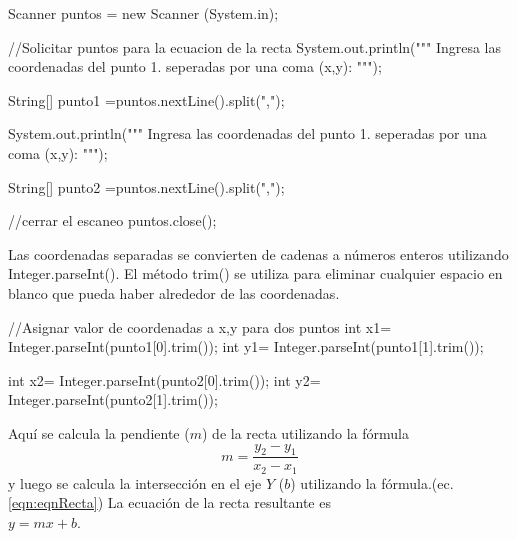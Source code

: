 \begin{javaCode}

Scanner puntos = new Scanner (System.in);
        
    //Solicitar puntos para la ecuacion de la recta  
    System.out.println("""
                        Ingresa las coordenadas del punto 1.
                        seperadas por una coma (x,y):
                           """);
    
    String[] punto1 =puntos.nextLine().split(",");
        
    System.out.println("""
                        Ingresa las coordenadas del punto 1.
                        seperadas por una coma (x,y):
                        """);
    
    String[] punto2 =puntos.nextLine().split(",");
        
    //cerrar el escaneo
    puntos.close();
        
\end{javaCode}

Las coordenadas separadas se convierten de cadenas a números enteros utilizando Integer.parseInt(). El método trim() se utiliza para eliminar cualquier espacio en blanco que pueda haber alrededor de las coordenadas.

\begin{javaCode}
    //Asignar valor de coordenadas a x,y para dos puntos
    int x1= Integer.parseInt(punto1[0].trim());
    int y1= Integer.parseInt(punto1[1].trim());
       
    int x2= Integer.parseInt(punto2[0].trim());
    int y2= Integer.parseInt(punto2[1].trim());
\end{javaCode}

Aquí se calcula la pendiente ($m$) de la recta utilizando la fórmula
\[
m = \frac{{y_2 - y_1}}{{x_2 - x_1}}
\]
y luego se calcula la intersección en el eje $Y$ ($b$) utilizando la fórmula.(ec. \ref{eqn:eqnRecta})
La ecuación de la recta resultante es\\ $y = mx + b$.

